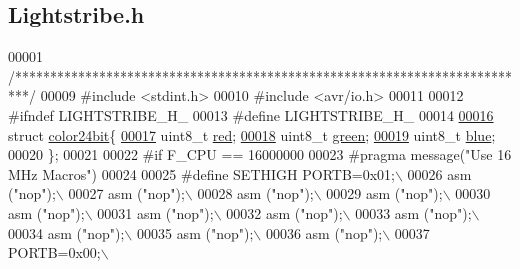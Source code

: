 \hypertarget{_lightstribe_8h_source}{}\subsection{Lightstribe.\+h}

\begin{DoxyCode}
00001 \textcolor{comment}{/**************************************************************************/}
00009 \textcolor{preprocessor}{#include <stdint.h>}
00010 \textcolor{preprocessor}{#include <avr/io.h>}
00011 
00012 \textcolor{preprocessor}{#ifndef LIGHTSTRIBE\_H\_}
00013 \textcolor{preprocessor}{#define LIGHTSTRIBE\_H\_}
00014 
\hypertarget{_lightstribe_8h_source_l00016}{}\hyperlink{structcolor24bit}{00016} \textcolor{keyword}{struct }\hyperlink{structcolor24bit}{color24bit}\{
\hypertarget{_lightstribe_8h_source_l00017}{}\hyperlink{structcolor24bit_ad47d918910aaa51c73160ac85999d09c}{00017}     uint8\_t \hyperlink{structcolor24bit_ad47d918910aaa51c73160ac85999d09c}{red};                                 
\hypertarget{_lightstribe_8h_source_l00018}{}\hyperlink{structcolor24bit_a90d21fa503b626c00cdc8d94863d5877}{00018}     uint8\_t \hyperlink{structcolor24bit_a90d21fa503b626c00cdc8d94863d5877}{green};                                 
\hypertarget{_lightstribe_8h_source_l00019}{}\hyperlink{structcolor24bit_a287b397e90d7b995c81ff54e741f96b2}{00019}     uint8\_t \hyperlink{structcolor24bit_a287b397e90d7b995c81ff54e741f96b2}{blue};                                   
00020 \};
00021 
00022 \textcolor{preprocessor}{#if F\_CPU == 16000000}
00023 \textcolor{preprocessor}{#pragma message("Use 16 MHz Macros")}
00024 
00025 \textcolor{preprocessor}{#define SETHIGH PORTB=0x01;\(\backslash\)}
00026 \textcolor{preprocessor}{               asm ("nop");\(\backslash\)}
00027 \textcolor{preprocessor}{               asm ("nop");\(\backslash\)}
00028 \textcolor{preprocessor}{               asm ("nop");\(\backslash\)}
00029 \textcolor{preprocessor}{               asm ("nop");\(\backslash\)}
00030 \textcolor{preprocessor}{               asm ("nop");\(\backslash\)}
00031 \textcolor{preprocessor}{               asm ("nop");\(\backslash\)}
00032 \textcolor{preprocessor}{               asm ("nop");\(\backslash\)}
00033 \textcolor{preprocessor}{               asm ("nop");\(\backslash\)}
00034 \textcolor{preprocessor}{               asm ("nop");\(\backslash\)}
00035 \textcolor{preprocessor}{               asm ("nop");\(\backslash\)}
00036 \textcolor{preprocessor}{               asm ("nop");\(\backslash\)}
00037 \textcolor{preprocessor}{               PORTB=0x00;\(\backslash\)}

\end{DoxyCode}

